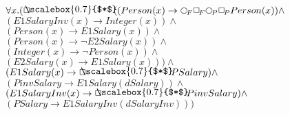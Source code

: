 \documentclass[a4paper,10pt]{article}
\begin{document}
 \newcommand{\nxt}{{\ensuremath\raisebox{0.25ex}{\text{\scriptsize$\bigcirc$}}}}
\newcommand{\Rdiamond}{\Diamond_{\!F}}
\newcommand{\Rbox}{\Box_{\!F}}
\newcommand{\Rnext}{\nxt_{\!F}}
\newcommand{\Ldiamond}{\Diamond_{\!P}}
\newcommand{\Lbox}{\Box_{\!P}}
\newcommand{\Lnext}{\nxt_{\!P}}
\newcommand{\SVdiamond}{\mathop{\ooalign{$\Diamond$ \cr \kern0.5ex
    \raisebox{0.35ex}{\scalebox{0.7}{$*$}}} \kern-0.9ex}}
\newcommand{\SVbox}{\mathop{\ooalign{$\Box$ \cr \kern0.42ex
    \raisebox{0.3ex}{\scalebox{0.7}{$*$}}} \kern-0.9ex}}


$ \forall x. ( \SVbox ((Person(x) \rightarrow  \Rnext  \Rbox  \Lnext  \Lbox Person(x)) \land $ \\ 
 $ (E1SalaryInv(x) \rightarrow Integer(x)) \land $ \\ 
 $ (Person(x) \rightarrow E1Salary(x)) \land $ \\ 
 $ (Person(x) \rightarrow  \lnot E2Salary(x)) \land $ \\ 
 $ (Integer(x) \rightarrow  \lnot Person(x)) \land $ \\ 
 $ (E2Salary(x) \rightarrow E1Salary(x))) \land $ \\ 
 $ (E1Salary(x) \rightarrow  \SVbox PSalary) \land $ \\ 
 $ (PinvSalary \rightarrow E1Salary(dSalary)) \land $ \\ 
 $ (E1SalaryInv(x) \rightarrow  \SVbox PinvSalary) \land $ \\ 
 $ (PSalary \rightarrow E1SalaryInv(dSalaryInv)))$ 
\end{document}
